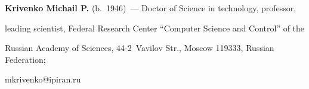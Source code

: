 \vspace*{-3pt}





\noindent


\textbf{Krivenko Michail P.} (b.\ 1946)~--- Doctor of Science in technology, professor, 


leading scientist, Federal Research Center ``Computer Science and Control'' of the 


Russian Academy of Sciences, 44-2~Vavilov Str., Moscow 119333, Russian Federation; 


\mbox{mkrivenko@ipiran.ru}








\label{end\stat}





\renewcommand{\bibname}{\protect\rm Литература} 


